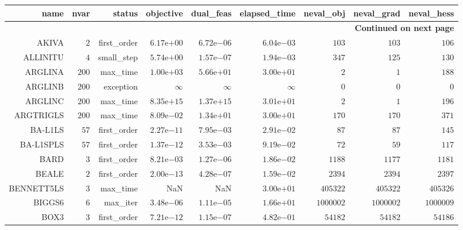 \begin{longtable}{rrrrrrrrr}
\hline
name & nvar & status & objective & dual\_feas & elapsed\_time & neval\_obj & neval\_grad & neval\_hess \\\hline
\endhead
\hline
\multicolumn{9}{r}{{\bfseries Continued on next page}}\\
\hline
\endfoot
\endlastfoot
AKIVA & \(     2\) & first\_order & \( 6.17\)e\(+00\) & \( 6.72\)e\(-06\) & \( 6.04\)e\(-03\) & \(   103\) & \(   103\) & \(   106\) \\
ALLINITU & \(     4\) & small\_step & \( 5.74\)e\(+00\) & \( 1.57\)e\(-07\) & \( 1.94\)e\(-03\) & \(   347\) & \(   125\) & \(   130\) \\
ARGLINA & \(   200\) & max\_time & \( 1.00\)e\(+03\) & \( 5.66\)e\(+01\) & \( 3.00\)e\(+01\) & \(     2\) & \(     1\) & \(   188\) \\
ARGLINB & \(   200\) & exception & \(\infty\) & \(\infty\) & \(\infty\) & \(     0\) & \(     0\) & \(     0\) \\
ARGLINC & \(   200\) & max\_time & \( 8.35\)e\(+15\) & \( 1.37\)e\(+15\) & \( 3.01\)e\(+01\) & \(     2\) & \(     1\) & \(   196\) \\
ARGTRIGLS & \(   200\) & max\_time & \( 8.09\)e\(-02\) & \( 1.34\)e\(+01\) & \( 3.00\)e\(+01\) & \(   170\) & \(   170\) & \(   371\) \\
BA-L1LS & \(    57\) & first\_order & \( 2.27\)e\(-11\) & \( 7.95\)e\(-03\) & \( 2.91\)e\(-02\) & \(    87\) & \(    87\) & \(   145\) \\
BA-L1SPLS & \(    57\) & first\_order & \( 1.37\)e\(-12\) & \( 3.53\)e\(-03\) & \( 9.19\)e\(-02\) & \(    72\) & \(    59\) & \(   117\) \\
BARD & \(     3\) & first\_order & \( 8.21\)e\(-03\) & \( 1.27\)e\(-06\) & \( 1.86\)e\(-02\) & \(  1188\) & \(  1177\) & \(  1181\) \\
BEALE & \(     2\) & first\_order & \( 2.00\)e\(-13\) & \( 4.28\)e\(-07\) & \( 1.59\)e\(-02\) & \(  2394\) & \(  2394\) & \(  2397\) \\
BENNETT5LS & \(     3\) & max\_time &       NaN &       NaN & \( 3.00\)e\(+01\) & \(405322\) & \(405322\) & \(405326\) \\
BIGGS6 & \(     6\) & max\_iter & \( 3.48\)e\(-06\) & \( 1.11\)e\(-05\) & \( 1.66\)e\(+01\) & \(1000002\) & \(1000002\) & \(1000009\) \\
BOX3 & \(     3\) & first\_order & \( 7.21\)e\(-12\) & \( 1.15\)e\(-07\) & \( 4.82\)e\(-01\) & \( 54182\) & \( 54182\) & \( 54186\) \\

\end{longtable}

